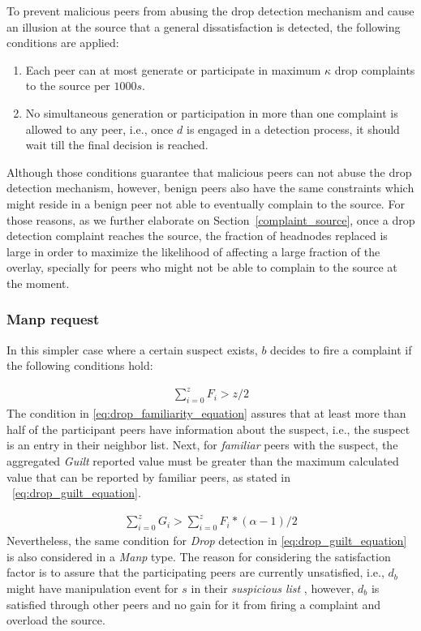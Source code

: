 To prevent malicious peers from abusing the drop detection mechanism and cause an illusion at the source that a general dissatisfaction is detected, the following conditions are applied:
\begin{enumerate}
 \item Each peer can at most generate or participate in maximum $\kappa$ drop complaints to the source per $1000s$.
 \item No simultaneous generation or participation in more than one complaint is allowed to any peer, i.e., once $d$ is engaged in a detection process, it should wait till the final decision is reached.
\end{enumerate}
Although those conditions guarantee that malicious peers can not abuse the drop detection mechanism,
however, benign peers also have the same constraints which might reside in a benign peer not able to eventually complain to the source.
For those reasons, as we further elaborate on Section~\ref{complaint_source}, once a drop detection complaint reaches the source, the fraction of headnodes replaced is large in order to maximize the likelihood of affecting a large fraction of the overlay, specially for peers who might not be able to complain to the source at the moment.

\subsubsection*{Manp request}
In this simpler case where a certain suspect exists, $b$ decides to fire a complaint if the following conditions hold:

\begin{align}
\label{eq:drop_familiarity_equation}
\sum_{i=0}^{z} F_i > z/2
\end{align}
The condition in \ref{eq:drop_familiarity_equation} assures that at least more than half of the participant peers have information about the suspect, i.e., the suspect is an entry in their neighbor list.
Next, for \textit{familiar} peers with the suspect, the aggregated \textit{Guilt} reported value must be greater than the maximum calculated value that can be reported by familiar peers, as stated in ~\ref{eq:drop_guilt_equation}.

\begin{align}
\label{eq:drop_guilt_equation}
\sum_{i=0}^{z} G_i > \sum_{i=0}^{z} F_i*(\alpha-1)/2
\end{align}
Nevertheless, the same condition for \textit{Drop} detection in \ref{eq:drop_guilt_equation} is also considered in a \textit{Manp} type.
The reason for considering the satisfaction factor is to assure that the participating peers are currently unsatisfied, i.e., $d_b$ might have manipulation event for $s$ in their \textit{suspicious list} , however, $d_b$ is satisfied through other peers and no gain for it from firing a complaint and overload the source.

